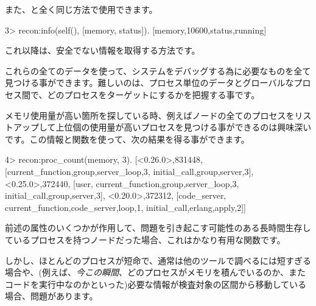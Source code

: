 また、と全く同じ方法で使用できます。

\begin{VerbatimEshell}
3> recon:info(self(), [memory, status]).
[{memory,10600},{status,running}]
\end{VerbatimEshell}

これ以降は、安全でない情報を取得する方法です。

これらの全てのデータを使って、システムをデバッグする為に必要なものを全て見つける事ができます。難しいのは、プロセス単位のデータとグローバルなプロセス間で、どのプロセスをターゲットにするかを把握する事です。

メモリ使用量が高い箇所を探している時、例えばノードの全てのプロセスをリストアップして上位個の使用量が高いプロセスを見つける事ができるのは興味深いです。この情報と関数を使って、次の結果を得る事ができます。

\begin{VerbatimEshell}
4> recon:proc_count(memory, 3).
[{<0.26.0>,831448,
  [{current_function,{group,server_loop,3}},
   {initial_call,{group,server,3}}]},
 {<0.25.0>,372440,
  [user,
   {current_function,{group,server_loop,3}},
   {initial_call,{group,server,3}}]},
 {<0.20.0>,372312,
  [code_server,
   {current_function,{code_server,loop,1}},
   {initial_call,{erlang,apply,2}}]}]
\end{VerbatimEshell}

前述の属性のいくつかが作用して、問題を引き起こす可能性のある長時間生存しているプロセスを持つノードだった場合、これはかなり有用な関数です。

しかし、ほとんどのプロセスが短命で、通常は他のツールで調べるには短すぎる場合や、(例えば、\emph{今この瞬間}、どのプロセスがメモリを積んでいるのか、またコードを実行中なのかといった)必要な情報が検査対象の区間から移動している場合、問題があります。

